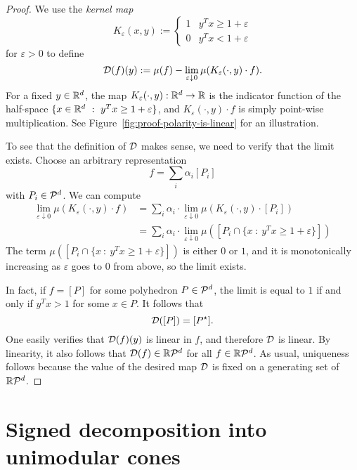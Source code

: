 \begin{proof}
  We use the \emph{kernel map}
  \[
    K_\varepsilon(x,y) := \begin{cases}
                1 & y^Tx \geq 1 + \varepsilon \\
                0 & y^Tx < 1 + \varepsilon
              \end{cases}
  \]
  for $\varepsilon > 0$ to define
  \[
    \mathcal{D}(f)(y) := \mu(f) - \lim_{\varepsilon \downarrow 0} \mu(K_\varepsilon(\cdot, y) \cdot f).
  \]
  For a fixed $y \in \mathbb{R}^d$,
  the map $K_\varepsilon(\cdot, y): \mathbb{R}^d \to \mathbb{R}$ is the indicator function
  of the half-space $\{ x \in \mathbb{R}^d ~:~ y^Tx \geq 1 + \varepsilon\}$,
  and $K_\varepsilon(\cdot, y) \cdot f$ is simply point-wise multiplication.
  See Figure~\ref{fig:proof-polarity-is-linear} for an illustration.

  To see that the definition of $\mathcal{D}$ makes sense,
  we need to verify that the limit exists.
  Choose an arbitrary representation
  \[
    f = \sum_i \alpha_i [P_i]
  \]
  with $P_i \in \mathcal{P}^d$.
  We can compute
  \begin{align*}
    \lim_{\varepsilon \downarrow 0} \mu(K_\varepsilon(\cdot, y) \cdot f)
      &= \sum_i \alpha_i \cdot \lim_{\varepsilon \downarrow 0} \mu(K_\varepsilon(\cdot, y) \cdot [P_i]) \\
      &= \sum_i \alpha_i \cdot \lim_{\varepsilon \downarrow 0} \mu([P_i \cap \{ x ~:~ y^Tx \geq 1 + \varepsilon \}])
  \end{align*}
  The term $\mu([P_i \cap \{ x ~:~ y^Tx \geq 1 + \varepsilon \}])$ is either $0$ or $1$,
  and it is monotonically increasing as $\varepsilon$ goes to $0$ from above, so the limit exists.

  In fact, if $f = [P]$ for some polyhedron $P \in \mathcal{P}^d$,
  the limit is equal to $1$ if and only if $y^Tx > 1$ for some $x \in P$.
  It follows that
  \[
    \mathcal{D}([P]) = [P^\star].
  \]
  One easily verifies that $\mathcal{D}(f)(y)$ is linear in $f$, and therefore $\mathcal{D}$ is linear.
  By linearity, it also follows that $\mathcal{D}(f) \in \mathbb{R}\mathcal{P}^d$ for all $f \in \mathbb{R}\mathcal{P}^d$.
  As usual, uniqueness follows because the value of the desired map $\mathcal{D}$ is fixed on a generating set of $\mathbb{R}\mathcal{P}^d$.
\end{proof}





\section{Signed decomposition into unimodular cones}

